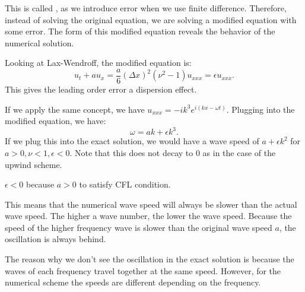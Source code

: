 \documentclass[../main/main.tex]{subfiles}
\begin{document}
\begin{remark}
    This is called , as we introduce error when we use finite difference. Therefore, instead of solving the original equation, we are solving a modified equation with some error. The form of this modified equation reveals the behavior of the numerical solution.
\end{remark}
Looking at Lax-Wendroff, the modified equation is: \[
    u_t + au_x = \frac{a}{6}(\Delta x) ^2 (\nu^2-1) u_{x x x} = \epsilon u_{ x x x}
.\] This gives the leading order error a dispersion effect.

If we apply the same concept, we have $u_{ x x x} = -i k^{3} e^{i(kx - \omega t)}$. Plugging into the modified equation, we have: \[
\omega = ak + \epsilon k^3
.\] If we plug this into the exact solution, we would have a wave speed of $a + \epsilon k^2$ for $a>0, \nu < 1, \epsilon < 0$. Note that this does not decay to 0 as in the case of the upwind scheme. 

\begin{remark}
   $\epsilon<0$ because  $a>0$ to satisfy CFL condition. 
\end{remark}
This means that the numerical wave speed will always be slower than the actual wave speed. The higher a wave number, the lower the wave speed. Because the speed of the higher frequency wave is slower than the original wave speed $a$, the oscillation is always behind.
\begin{remark}
The reason why we don't see the oscillation in the exact solution is because the waves of each frequency travel together at the same speed. However, for the numerical scheme the speeds are different depending on the frequency.  
\end{remark}
\end{document}
